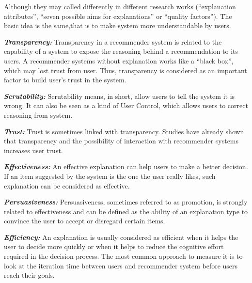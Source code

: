         \indent Although they may called differently in different research works
        (``explanation attributes''\cite{al2013explanations}, ``seven possible aims for explanations''\cite{tintarev2012evaluating}
        or ``quality factors''\cite{gedikli2014should}).
        The basic idea is the same,that is to make system more understandable by users.
        
        \indent \textbf{\textit{Transparency:}} Transparency in a recommender system is related to
         the capability of a system to expose the reasoning behind a recommendation to its users\cite{herlocker2000explaining}.
         A recommender systems without explanation works like a ``black box'', which may lost trust from user. 
         Thus, transparency is considered as an important factor to build user's trust in the system\cite{swearingen2002interaction}.

        \indent \textbf{\textit{Scrutability:}} Scrutability means, in short, allow users to tell the system it is wrong.
        It can also be seen as a kind of User Control, which allows users to correct reasoning from system\cite{czarkowski2002scrutable}.
        
        \indent \textbf{\textit{Trust:}} Trust is sometimes linked with transparency.
        Studies have already shown that transparency and 
        the possibility of interaction with recommender systems increases user trust\cite{felfernig2007knowledge}\cite{sinha2002role}.
        
        \indent \textbf{\textit{Effectiveness:}} An effective explanation can help users to make a better decision.
        If an item suggested by the system is the one the user really likes, such explanation can be considered as effective.

        \indent \textbf{\textit{Persuasiveness:}} Persuasiveness, sometimes referred to as promotion, 
        is strongly related to effectiveness and 
        can be defined as the ability of an explanation type to convince the user to accept or disregard certain items\cite{gedikli2014should}.

        \indent \textbf{\textit{Efficiency:}} An explanation is usually considered as efficient when
         it helps the user to decide more quickly or when it helps to reduce the cognitive effort required in the decision process\cite{gedikli2014should}.
         The most common approach to measure it is to look at the iteration time between users and recommender system before users reach their goals.

